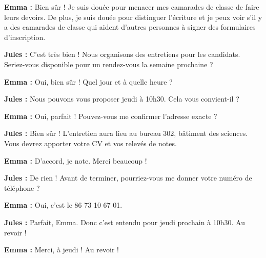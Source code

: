 \documentclass[a4paper,12pt]{article}
\begin{document}
\textbf{Emma :} Bien sûr ! Je suis douée pour menacer mes camarades de classe de faire leurs devoirs. De plus, je suis douée pour distinguer l'écriture et je peux voir s'il y a des camarades de classe qui aident d'autres personnes à signer des formulaires d'inscription.

\textbf{Jules :} C'est très bien ! Nous organisons des entretiens pour les candidats. Seriez-vous disponible pour un rendez-vous la semaine prochaine ?

\textbf{Emma :} Oui, bien sûr ! Quel jour et à quelle heure ?

\textbf{Jules :} Nous pouvons vous proposer jeudi à 10h30. Cela vous convient-il ?

\textbf{Emma :} Oui, parfait ! Pouvez-vous me confirmer l'adresse exacte ?

\textbf{Jules :} Bien sûr ! L'entretien aura lieu au bureau 302, bâtiment des sciences. Vous devrez apporter votre CV et vos relevés de notes.

\textbf{Emma :} D'accord, je note. Merci beaucoup !

\textbf{Jules :} De rien ! Avant de terminer, pourriez-vous me donner votre numéro de téléphone ?

\textbf{Emma :} Oui, c'est le 86 73 10 67 01.

\textbf{Jules :} Parfait, Emma. Donc c'est entendu pour jeudi prochain à 10h30. Au revoir !

\textbf{Emma :} Merci, à jeudi ! Au revoir !
\end{document}
